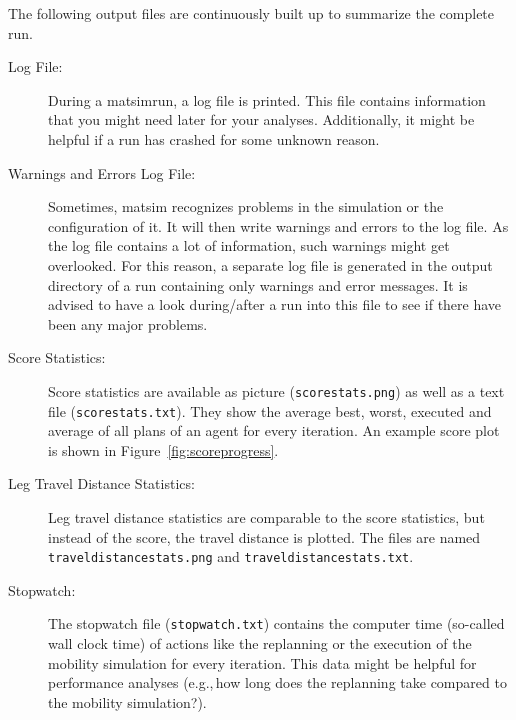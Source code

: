 The following output files are continuously built up to summarize the complete run.
\begin{description}

  \item[Log File:]
During a \gls{matsimrun}, a log file is printed. This file contains information that you might need later for your analyses. Additionally, it might be helpful if a run has crashed for some unknown reason. 

\item[Warnings and Errors Log File:]
Sometimes, \gls{matsim} recognizes problems in the simulation or the configuration of it. It will then write warnings and errors to the log file. As the log file contains a lot of information, such warnings might get overlooked. For this reason, a separate log file is generated in the output directory of a run containing only warnings and error messages. It is advised to have a look during/after a run into this file to see if there have been any major problems.

\item[Score Statistics:]
Score statistics are available as picture (\lstinline|scorestats.png|) as well as a text file (\lstinline|scorestats.txt|). They show the average best, worst, executed and average of all plans of an agent for every iteration. An example score plot is shown in Figure~\ref{fig:scoreprogress}.

\item[Leg Travel Distance Statistics:]
Leg travel distance statistics are comparable to the score statistics, but instead of the score, the travel distance is plotted. The files are named \lstinline|traveldistancestats.png| and \lstinline|traveldistancestats.txt|.

\item[Stopwatch:]
The stopwatch file (\lstinline|stopwatch.txt|) contains the computer time (so-called wall clock time) of actions like the replanning or the execution of the mobility simulation for every iteration. This data might be helpful for performance analyses (e.g.,\,how long does the replanning take compared to the mobility simulation?).

\end{description}


